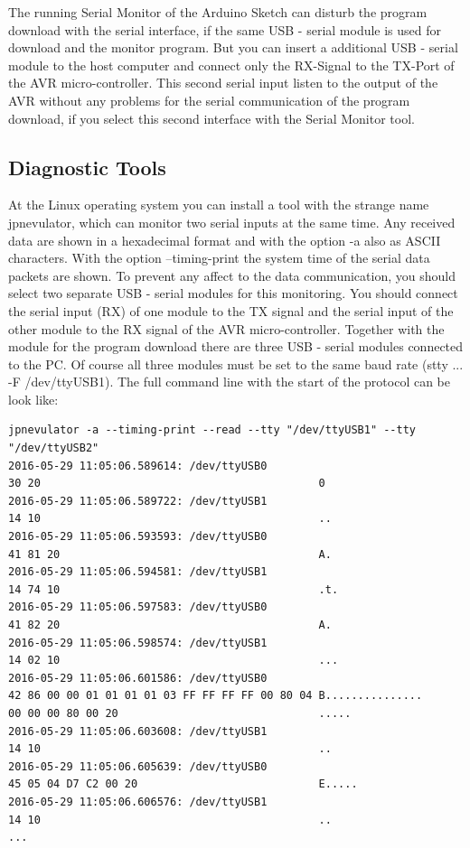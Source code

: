 The running Serial Monitor of the Arduino Sketch can disturb the program download with the
serial interface, if the same USB - serial module is used for download and the monitor program.
But you can insert a additional USB - serial module to the host computer and connect
only the RX-Signal to the TX-Port of the AVR micro-controller.
This second serial input listen to the output of the AVR without any problems
for the serial communication of the program download, if you select
this second interface with the Serial Monitor tool.

\subsection{Diagnostic Tools}
At the Linux operating system you can install a tool with the strange name jpnevulator, which
can monitor two serial inputs at the same time.
Any received data are shown in a hexadecimal format and with the option -a also as ASCII characters.
With the option --timing-print the system time of the serial data packets are shown.
To prevent any affect to the data communication, you should select two
separate USB - serial modules for this monitoring.
You should connect the serial input (RX) of one module to the TX signal and the 
serial input of the other module to the RX signal of the AVR micro-controller.
Together with the module for the program download there are three USB - serial modules
connected to the PC.
Of course all three modules must be set to the same baud rate (stty ... -F /dev/ttyUSB1).
The full command line with the start of the protocol can be look like:
\begin{verbatim}
jpnevulator -a --timing-print --read --tty "/dev/ttyUSB1" --tty "/dev/ttyUSB2"
2016-05-29 11:05:06.589614: /dev/ttyUSB0
30 20                                           0
2016-05-29 11:05:06.589722: /dev/ttyUSB1
14 10                                           ..
2016-05-29 11:05:06.593593: /dev/ttyUSB0
41 81 20                                        A.
2016-05-29 11:05:06.594581: /dev/ttyUSB1
14 74 10                                        .t.
2016-05-29 11:05:06.597583: /dev/ttyUSB0
41 82 20                                        A.
2016-05-29 11:05:06.598574: /dev/ttyUSB1
14 02 10                                        ...
2016-05-29 11:05:06.601586: /dev/ttyUSB0
42 86 00 00 01 01 01 01 03 FF FF FF FF 00 80 04 B...............
00 00 00 80 00 20                               .....
2016-05-29 11:05:06.603608: /dev/ttyUSB1
14 10                                           ..
2016-05-29 11:05:06.605639: /dev/ttyUSB0
45 05 04 D7 C2 00 20                            E.....
2016-05-29 11:05:06.606576: /dev/ttyUSB1
14 10                                           ..
...
\end{verbatim}
